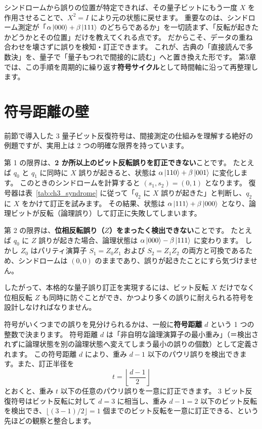 シンドロームから誤りの位置が特定できれば、その量子ビットにもう一度 $X$ を作用させることで、$X^2 = I$ により元の状態に戻せます。
重要なのは、シンドローム測定が「$\alpha\ket{000}+\beta\ket{111}$ のどちらであるか」を一切読まず、「反転が起きたかどうかとその位置」だけを教えてくれる点です。
だからこそ、データの重ね合わせを壊さずに誤りを検知・訂正できます。
これが、古典の「直接読んで多数決」を、量子で「量子もつれで間接的に読む」へと置き換えた形です。
第5章では、この手順を周期的に繰り返す\textbf{符号サイクル}として時間軸に沿って再整理します。

\section{符号距離の壁}\label{sec:distance_wall}

前節で導入した 3 量子ビット反復符号は、間接測定の仕組みを理解する絶好の例題ですが、実用上は 2 つの明確な限界を持っています。

第 1 の限界は、\textbf{2 か所以上のビット反転誤りを訂正できない}ことです。
たとえば $q_0$ と $q_1$ に同時に $X$ 誤りが起きると、状態は $\alpha\ket{110} + \beta\ket{001}$ に変化します。
このときのシンドロームを計算すると $(s_1, s_2) = (0, 1)$ となります。
復号器は表~\ref{tab:ch3_syndrome} に従って「$q_2$ に $X$ 誤りが起きた」と判断し、$q_2$ に $X$ をかけて訂正を試みます。
その結果、状態は $\alpha\ket{111} + \beta\ket{000}$ となり、論理ビットが反転（論理誤り）して訂正に失敗してしまいます。

第 2 の限界は、\textbf{位相反転誤り（$Z$）をまったく検出できない}ことです。
たとえば $q_0$ に $Z$ 誤りが起きた場合、論理状態は $\alpha\ket{000} - \beta\ket{111}$ に変わります。
しかし $Z_0$ はパリティ演算子 $S_1 = Z_0 Z_1$ および $S_2 = Z_1 Z_2$ の両方と可換であるため、シンドロームは $(0, 0)$ のままであり、誤りが起きたことにすら気づけません。

したがって、本格的な量子誤り訂正を実現するには、ビット反転 $X$ だけでなく位相反転 $Z$ も同時に防ぐことができ、かつより多くの誤りに耐えられる符号を設計しなければなりません。

符号がいくつまでの誤りを見分けられるかは、一般に\textbf{符号距離} $d$ という 1 つの整数で決まります。
符号距離 $d$ は「非自明な論理演算子の最小重み」（＝検出されずに論理状態を別の論理状態へ変えてしまう最小の誤りの個数）として定義されます。
この符号距離 $d$ により、重み $d-1$ 以下のパウリ誤りを検出できます。また、訂正半径を
\begin{equation}
  t = \left\lfloor \frac{d-1}{2} \right\rfloor
\end{equation}
とおくと、重み $t$ 以下の任意のパウリ誤りを一意に訂正できます。
3 ビット反復符号はビット反転に対して $d=3$ に相当し、重み $d-1 = 2$ 以下のビット反転を検出でき、$\lfloor (3-1)/2 \rfloor = 1$ 個までのビット反転を一意に訂正できる、という先ほどの観察と整合します。

